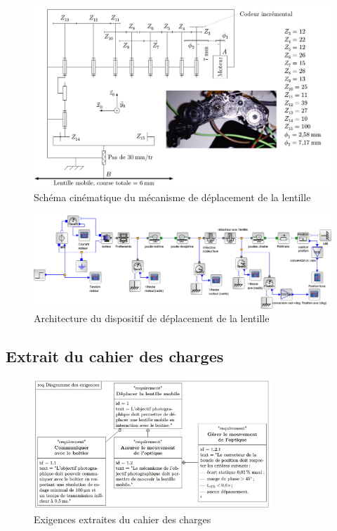 \begin{figure}[!htb]
\begin{center}
\includegraphics[width=1.0\textwidth]{images/image_fig4.jpg}
\caption{Schéma cinématique du mécanisme de déplacement de la lentille \label{fig4}}
\end{center}
\end{figure}

\begin{figure}[!htb]
\begin{center}
\includegraphics[width=1.0\textwidth]{images/image13.png}
\caption{Architecture du dispositif de déplacement de la lentille \label{fig5}}
\end{center}
\end{figure}

\subsection{Extrait du cahier des charges}\label{extrait-du-cahier-des-charges}

\begin{figure}[!htb]
\begin{center}
\includegraphics[width=0.8\textwidth]{images/image_fig6.jpg}
\caption{Exigences extraites du cahier des charges \label{fig6}}
\end{center}
\end{figure}

